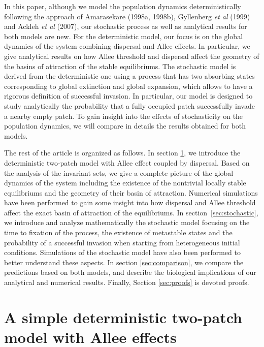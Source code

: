\indent In this paper, although we model the population dynamics deterministically following the approach of
 Amarasekare (1998a, 1998b), Gyllenberg \emph{et al} (1999) and Ackleh \emph{et al} (2007), our stochastic process as well as
 analytical results for both models are new.
 For the deterministic model, our focus is on the global dynamics of the system combining dispersal and Allee effects.
 In particular, we give analytical results on how Allee threshold and dispersal affect the geometry of the basins of attraction
 of the stable equilibriums.
 The stochastic model is derived from the deterministic one using a process that has two absorbing states corresponding to global
 extinction and global expansion, which allows to have a rigorous definition of successful invasion.
 In particular, our model is designed to study analytically the probability that a fully occupied patch successfully invade
 a nearby empty patch.
 To gain insight into the effects of stochasticity on the population dynamics, we will compare in details the results obtained
 for both models.

\indent The rest of the article is organized as follows.
 In section \ref{sec:deterministic}, we introduce the deterministic two-patch model with Allee effect coupled by dispersal.
 Based on the analysis of the invariant sets, we give a complete picture of the global dynamics of the system including the existence
 of the nontrivial locally stable equilibriums and the geometry of their basin of attraction.
 Numerical simulations have been performed to gain some insight into how dispersal and Allee threshold affect the exact basin of
 attraction of the equilibriums.
 In section~\ref{sec:stochastic}, we introduce and analyze mathematically the stochastic model focusing on the time to fixation of the
 process, the existence of metastable states and the probability of a successful invasion when starting from heterogeneous initial
 conditions.
 Simulations of the stochastic model have also been performed to better understand these aspects.
 In section \ref{sec:comparison}, we compare the predictions based on both models, and describe the biological implications of
 our analytical and numerical results.
 Finally, Section \ref{sec:proofs} is devoted proofs.

\section{ A simple deterministic two-patch model with Allee effects}
\label{sec:deterministic}

